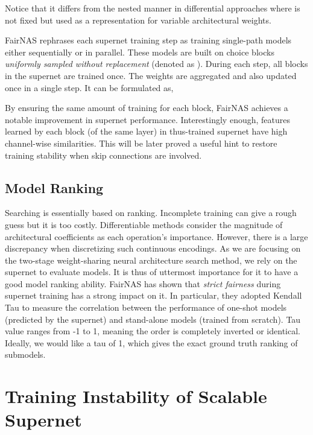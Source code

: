 \documentclass[10pt,twocolumn,letterpaper]{article}
\theoremstyle{definition}
\begin{document}
Notice that it differs from the nested manner in differential approaches \cite{liu2018darts,dong2019searching} where  is not fixed but used as a representation for variable architectural weights. 

FairNAS \cite{chu2019fairnas} rephrases each supernet training step as training  single-path models either sequentially or in parallel. These models are built on choice blocks \emph{uniformly sampled without replacement} (denoted as ). During each step, all blocks in the supernet are trained once. The weights are aggregated and also updated once in a single step. It can be formulated as,





By ensuring the same amount of training for each block, FairNAS achieves a notable improvement in supernet performance. Interestingly enough, features learned by each block (of the same layer) in thus-trained supernet have high channel-wise similarities. This will be later proved a useful hint to restore training stability when skip connections are involved. 

\subsection{Model Ranking}
Searching is essentially based on ranking. Incomplete training can give a rough guess \cite{zoph2018learning} but it is too costly. Differentiable methods \cite{liu2018darts} consider the magnitude of architectural coefficients as each operation's importance. However, there is a large discrepancy when discretizing such continuous encodings.  As we are focusing on the two-stage weight-sharing neural architecture search method, we rely on the supernet to evaluate models. It is thus of uttermost importance for it to have a good model ranking ability. FairNAS \cite{chu2019fairnas} has shown that \emph{strict fairness} during supernet training has a strong impact on it.  In particular, they adopted Kendall Tau \cite{kendall1938new} to measure the correlation between the performance of one-shot models (predicted by the supernet) and stand-alone models (trained from scratch). Tau value ranges from -1 to 1, meaning the order is completely inverted or identical. Ideally, we would like a tau of 1, which gives the exact ground truth ranking of submodels.

\section{Training Instability of Scalable Supernet}\label{sec:instability}
\end{document}
